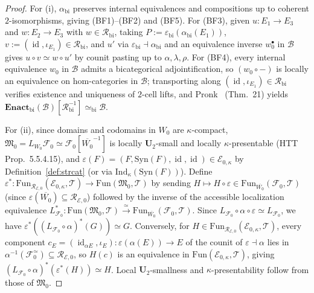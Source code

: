 \documentclass[11pt]{article}
\theoremstyle{plain}
\theoremstyle{definition}
\newcommand{\cF}{\mathcal{F}}
\newcommand{\fM}{\mathfrak{M}}
\newcommand{\Fun}{\mathrm{Fun}}
\newcommand{\Syn}{\mathrm{Syn}}
\newcommand{\cE}{\mathcal{E}}
\DeclareMathOperator{\id}{id}
\begin{document}
\begin{proof}
For (i), $\alpha_{\mathrm{bi}}$ preserves internal equivalences and compositions up to coherent $2$-isomorphisms, giving (BF1)--(BF2) and (BF5). For (BF3), given $u : E_1 \to E_3$ and $w : E_2 \to E_3$ with $w \in \mathcal{R}_{\mathrm{bi}}$, taking $P := \varepsilon_{\mathrm{bi}}(\alpha_{\mathrm{bi}}(E_1))$, $v := (\id, \iota_{E_1}) \in \mathcal{R}_{\mathrm{bi}}$, and $u'$ via $\varepsilon_{\mathrm{bi}} \dashv \alpha_{\mathrm{bi}}$ and an equivalence inverse $w_0^\bullet$ in $\mathcal{B}$ gives $u \circ v \simeq w \circ u'$ by counit pasting up to $\alpha, \lambda, \rho$. For (BF4), every internal equivalence $w_0$ in $\mathcal{B}$ admits a bicategorical adjointification, so $(w_0 \circ -)$ is locally an equivalence on hom-categories in $\mathcal{B}$; transporting along $(\id, \iota_{E_1}) \in \mathcal{R}_{\mathrm{bi}}$ verifies existence and uniqueness of $2$-cell lifts, and Pronk~\cite{Pronk1996} (Thm.~21) yields $\mathbf{Enact}_{\mathrm{bi}}(\mathcal{B})[\mathcal{R}_{\mathrm{bi}}^{-1}] \simeq_{\mathrm{bi}} \mathcal{B}$.

For (ii), since domains and codomains in $W_0$ are $\kappa$-compact, $\fM_0 = L_{W_0}\cF_0 \simeq \cF_0[\overline{W_0}^{-1}]$ is locally $\mathbf{U}_2$-small and locally $\kappa$-presentable (HTT Prop.~5.5.4.15), and $\varepsilon(F) = (F, \Syn(F), \id, \id) \in \cE_{0,\kappa}$ by Definition~\ref{def:strcat} (or via $\mathrm{Ind}_\kappa(\Syn(F))$). Define $\varepsilon^* : \Fun_{\mathcal{R}_{\cE,0}}(\cE_{0,\kappa}, \mathcal{T}) \to \Fun(\fM_0, \mathcal{T})$ by sending $H \mapsto H \circ \varepsilon \in \Fun_{\overline{W_0}}(\cF_0, \mathcal{T})$ (since $\varepsilon(\overline{W_0}) \subseteq \mathcal{R}_{\cE,0}$) followed by the inverse of the accessible localization equivalence $L_{\cF_0}^* : \Fun(\fM_0, \mathcal{T}) \xrightarrow{\simeq} \Fun_{\overline{W_0}}(\cF_0, \mathcal{T})$. Since $L_{\cF_0} \circ \alpha \circ \varepsilon \simeq L_{\cF_0}$, we have $\varepsilon^*((L_{\cF_0} \circ \alpha)^*(G)) \simeq G$. Conversely, for $H \in \Fun_{\mathcal{R}_{\cE,0}}(\cE_{0,\kappa}, \mathcal{T})$, every component $c_E = (\id_{\alpha E}, \iota_E) : \varepsilon(\alpha(E)) \to E$ of the counit of $\varepsilon \dashv \alpha$ lies in $\alpha^{-1}(\cF_0^{\simeq}) \subseteq \mathcal{R}_{\cE,0}$, so $H(c)$ is an equivalence in $\Fun(\cE_{0,\kappa}, \mathcal{T})$, giving $(L_{\cF_0} \circ \alpha)^*(\varepsilon^*(H)) \simeq H$. Local $\mathbf{U}_2$-smallness and $\kappa$-presentability follow from those of $\fM_0$.
\end{proof}
\end{document}
